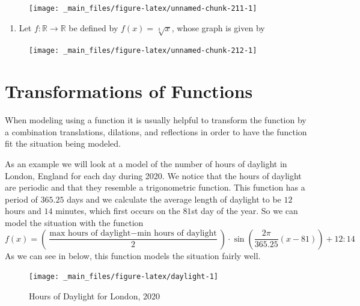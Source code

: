 \documentclass[
]{book}
\providecommand{\tightlist}{%
  \setlength{\itemsep}{0pt}\setlength{\parskip}{0pt}}
\theoremstyle{definition}
\theoremstyle{definition}
\theoremstyle{definition}
\theoremstyle{remark}
\begin{document}
\begin{enumerate}
\begin{figure}
     {\centering \texttt{[image: \_main\_files/figure-latex/unnamed-chunk-211-1]} 

     }

     \end{figure}

  \begin{enumerate}
  \def\labelenumii{\alph{enumii}.}
  \tightlist
  \item
    Let \(f:\mathbb{R} \rightarrow \mathbb{R}\) be defined by \(f(x)=\sqrt[3]{x}\), whose graph is given by
  \end{enumerate}

  \begin{figure}

     {\centering \texttt{[image: \_main\_files/figure-latex/unnamed-chunk-212-1]} 

     }

     \end{figure}
\end{enumerate}

\hypertarget{transformations-of-functions}{%
\section{Transformations of Functions}\label{transformations-of-functions}}

When modeling using a function it is usually helpful to transform the function by a combination translations, dilations, and reflections in order to have the function fit the situation being modeled.

As an example we will look at a model of the number of hours of daylight in London, England for each day during 2020. We notice that the hours of daylight are periodic and that they resemble a trigonometric function. This function has a period of \(365.25\) days and we calculate the average length of daylight to be \(12\) hours and \(14\) minutes, which first occurs on the \(81\)st day of the year. So we can model the situation with the function \[f(x)= \left( \frac{\mbox{max hours of daylight} - \mbox{min hours of daylight}}{2}\right) \cdot \sin \left(\frac{2\pi}{365.25} \left(x-81\right)\right) + 12:14\]
As we can see in below, this function models the situation fairly well.

\begin{figure}

{\centering \texttt{[image: \_main\_files/figure-latex/daylight-1]} 

}

\caption{Hours of Daylight for London, 2020}\label{fig:daylight}
\end{figure}
\end{document}
